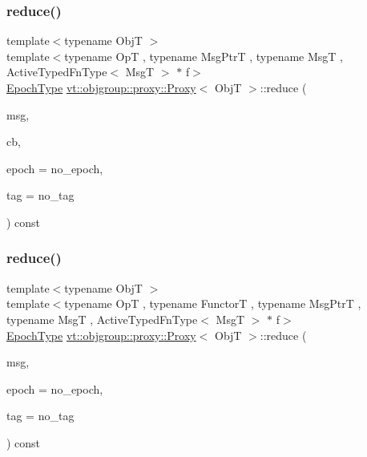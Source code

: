 \subsubsection{\texorpdfstring{reduce()}{reduce()}\hspace{0.1cm}{\footnotesize\ttfamily [1/3]}}
{\footnotesize\ttfamily template$<$typename ObjT $>$ \\
template$<$typename OpT , typename Msg\+PtrT , typename MsgT , Active\+Typed\+Fn\+Type$<$ Msg\+T $>$ $\ast$ f$>$ \\
\hyperlink{namespacevt_a985a5adf291c34a3ca263b3378388236}{Epoch\+Type} \hyperlink{structvt_1_1objgroup_1_1proxy_1_1_proxy}{vt\+::objgroup\+::proxy\+::\+Proxy}$<$ ObjT $>$\+::reduce (\begin{DoxyParamCaption}\item[{Msg\+PtrT}]{msg,  }\item[{\hyperlink{namespacevt_a36db99df4c973d48b1118a293fff533f}{Callback}$<$ MsgT $>$}]{cb,  }\item[{\hyperlink{namespacevt_a985a5adf291c34a3ca263b3378388236}{Epoch\+Type}}]{epoch = {\ttfamily no\+\_\+epoch},  }\item[{\hyperlink{namespacevt_a84ab281dae04a52a4b243d6bf62d0e52}{Tag\+Type}}]{tag = {\ttfamily no\+\_\+tag} }\end{DoxyParamCaption}) const}

\mbox{\label{structvt_1_1objgroup_1_1proxy_1_1_proxy_a9be2268a987c47224798067862e89ab5}} 
\subsubsection{\texorpdfstring{reduce()}{reduce()}\hspace{0.1cm}{\footnotesize\ttfamily [2/3]}}
{\footnotesize\ttfamily template$<$typename ObjT $>$ \\
template$<$typename OpT , typename FunctorT , typename Msg\+PtrT , typename MsgT , Active\+Typed\+Fn\+Type$<$ Msg\+T $>$ $\ast$ f$>$ \\
\hyperlink{namespacevt_a985a5adf291c34a3ca263b3378388236}{Epoch\+Type} \hyperlink{structvt_1_1objgroup_1_1proxy_1_1_proxy}{vt\+::objgroup\+::proxy\+::\+Proxy}$<$ ObjT $>$\+::reduce (\begin{DoxyParamCaption}\item[{Msg\+PtrT}]{msg,  }\item[{\hyperlink{namespacevt_a985a5adf291c34a3ca263b3378388236}{Epoch\+Type}}]{epoch = {\ttfamily no\+\_\+epoch},  }\item[{\hyperlink{namespacevt_a84ab281dae04a52a4b243d6bf62d0e52}{Tag\+Type}}]{tag = {\ttfamily no\+\_\+tag} }\end{DoxyParamCaption}) const}

